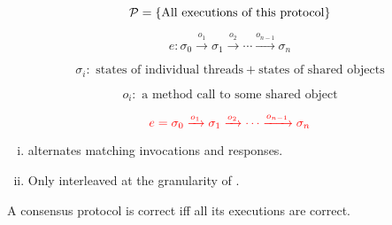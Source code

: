 
\begin{frame}{}
  \begin{description}[<+->]
    \item[Protocol] 
      \[
	\mathcal{P} = \{\text{All executions of this protocol}\}
      \]
    \item[Execution] 
      \[
	e: \sigma_0 \xrightarrow{o_1} \sigma_1 \xrightarrow{o_2} \cdots \xrightarrow{o_{n-1}} \sigma_{n}
      \]
    \item[State] 
      \[
	\sigma_i: \text{ states of individual threads} + \text{states of shared objects}
      \]
    \item[Operation] 
      \[
	o_i: \text{ a method call to some shared object}
      \]
  \end{description}
\end{frame}

\begin{frame}{}
  \[
    \textcolor{red}{e = \sigma_0 \xrightarrow{o_1} \sigma_1 \xrightarrow{o_2} \cdots \xrightarrow{o_{n-1}} \sigma_{n}}
  \]

  \begin{enumerate}[(i)]
    \item {} alternates matching invocations and responses.
    \item Only interleaved at the granularity of .
  \end{enumerate}

  \vspace{0.30cm}
  \begin{theorem}[]
    A consensus protocol is correct iff all its  executions are correct.
  \end{theorem}
\end{frame}
